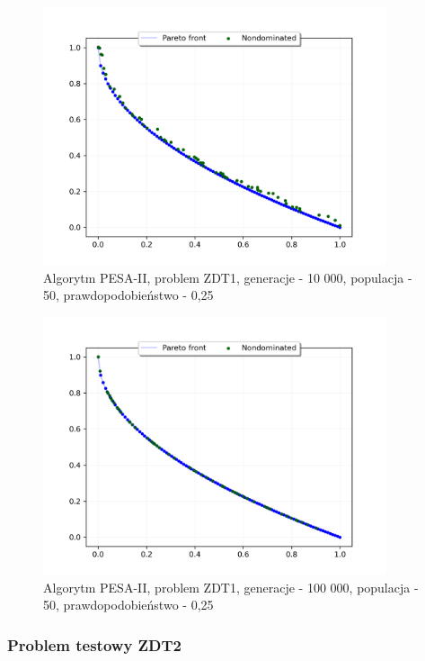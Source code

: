 \documentclass{classrep}
\begin{document}
\begin{figure}[H]
    \centering
    \includegraphics[width=0.9\textwidth]{img2/PESAII_ZDT1_g10000_p50_r0,25.png}
    \caption{Algorytm PESA-II, problem ZDT1, \newline generacje - 10 000, populacja - 50, prawdopodobieństwo - 0,25}
\end{figure}

\begin{figure}[H]
    \centering
    \includegraphics[width=0.9\textwidth]{img2/PESAII_ZDT1_g100000_p50_r0,25.png}
    \caption{Algorytm PESA-II, problem ZDT1, \newline generacje - 100 000, populacja - 50, prawdopodobieństwo - 0,25}
\end{figure}

\subsubsection{Problem testowy ZDT2}
\end{document}
